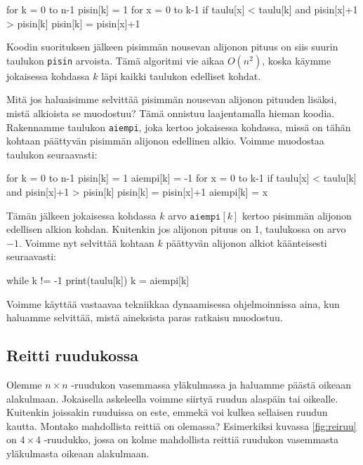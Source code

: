 \begin{code}
for k = 0 to n-1
    pisin[k] = 1
    for x = 0 to k-1
        if taulu[x] < taulu[k] and pisin[x]+1 > pisin[k]
            pisin[k] = pisin[x]+1
\end{code}

Koodin suorituksen jälkeen pisimmän nousevan alijonon pituus on
siis suurin taulukon \texttt{pisin} arvoista.
Tämä algoritmi vie aikaa $O(n^2)$, koska käym\-me jokaisessa
kohdassa $k$ läpi kaikki taulukon edelliset kohdat.

Mitä jos haluaisimme selvittää pisimmän nousevan alijonon
pituuden lisäksi, mistä alkioista se muodostuu?
Tämä onnistuu laajentamalla hieman koodia.
Rakennamme taulukon \texttt{aiempi},
joka kertoo jokaisessa kohdassa, missä on tähän kohtaan
päättyvän pisimmän alijonon edellinen alkio.
Voimme muodostaa taulukon seuraavasti:

\begin{code}
for k = 0 to n-1
    pisin[k] = 1
    aiempi[k] = -1
    for x = 0 to k-1
        if taulu[x] < taulu[k] and pisin[x]+1 > pisin[k]
            pisin[k] = pisin[x]+1
            aiempi[k] = x
\end{code}

Tämän jälkeen jokaisessa kohdassa $k$ arvo $\texttt{aiempi}[k]$
kertoo pisimmän alijonon edellisen alkion kohdan.
Kuitenkin jos alijonon pituus on 1, taulukossa on arvo $-1$.
Voimme nyt selvittää kohtaan $k$ päättyvän alijonon alkiot
käänteisesti seuraavasti:

\begin{code}
while k != -1
    print(taulu[k])
    k = aiempi[k]
\end{code}

Voimme käyttää vastaavaa tekniikkaa
dynaamisessa ohjelmoinnissa aina, kun haluamme
selvittää, mistä aineksista paras ratkaisu muodostuu.

\subsection{Reitti ruudukossa}

Olemme $n \times n$ -ruudukon vasemmassa yläkulmassa ja haluamme
päästä oikeaan alakulmaan.
Jokaisella askeleella voimme siirtyä ruudun alaspäin tai oikealle.
Kuitenkin joissakin ruuduissa on este, emmekä voi kulkea sellaisen
ruudun kautta.
Montako mahdollista reittiä on olemassa?
Esimerkiksi kuvassa \ref{fig:reiruu} on $4 \times 4$ -ruudukko,
jossa on kolme mahdollista reittiä ruudukon
vasemmasta yläkulmasta oikeaan alakulmaan.


